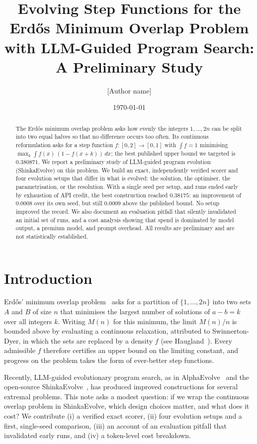 \documentclass[11pt]{article}
\title{Evolving Step Functions for the Erd\H{o}s Minimum Overlap Problem\\
with LLM-Guided Program Search: A Preliminary Study}
\author{[Author name]}
\date{\today}
\begin{document}
\maketitle

\begin{abstract}
The Erd\H{o}s minimum overlap problem asks how evenly the integers
$1,\dots,2n$ can be split into two equal halves so that no difference occurs
too often. Its continuous reformulation asks for a step function
$f:[0,2]\to[0,1]$ with $\int f = 1$ minimising
$\max_k \int f(x)\,(1-f(x+k))\,dx$; the best published upper bound we targeted
is $0.380871$. We report a preliminary study of LLM-guided program evolution
(ShinkaEvolve) on this problem. We build an exact, independently verified
scorer and four evolution setups that differ in what is evolved: the solution,
the optimiser, the parametrisation, or the resolution. With a single seed per
setup, and runs ended early by exhaustion of API credit, the best construction
reached $0.38175$: an improvement of $0.0008$ over its own seed, but still
$0.0009$ above the published bound. No setup improved the record. We also
document an evaluation pitfall that silently invalidated an initial set of
runs, and a cost analysis showing that spend is dominated by model output, a
premium model, and prompt overhead. All results are preliminary and are not
statistically established.
\end{abstract}

\section{Introduction}

Erd\H{o}s' minimum overlap problem~\cite{erdos55} asks for a partition of
$\{1,\dots,2n\}$ into two sets $A$ and $B$ of size $n$ that minimises the
largest number of solutions of $a - b = k$ over all integers $k$. Writing
$M(n)$ for this minimum, the limit $M(n)/n$ is bounded above by evaluating a
continuous relaxation, attributed to Swinnerton-Dyer, in which the sets are
replaced by a density $f$ (see Haugland~\cite{haugland16}). Every admissible
$f$ therefore certifies an upper bound on the limiting constant, and progress
on the problem takes the form of ever-better step functions.

Recently, LLM-guided evolutionary program search, as in
AlphaEvolve~\cite{alphaevolve} and the open-source
ShinkaEvolve~\cite{shinka}, has produced improved constructions for several
extremal problems. This note asks a modest question: if we wrap the continuous
overlap problem in ShinkaEvolve, which design choices matter, and what does it
cost? We contribute (i) a verified exact scorer, (ii) four evolution setups and
a first, single-seed comparison, (iii) an account of an evaluation pitfall that
invalidated early runs, and (iv) a token-level cost breakdown.
\end{document}
